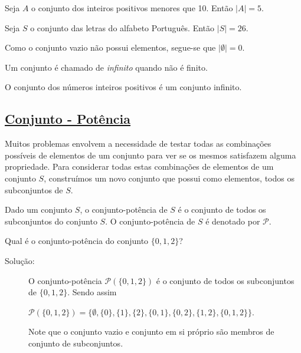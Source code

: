 \begin{exmp}
\label{exem38}
Seja $A$ o conjunto dos inteiros positivos menores que 10. Então $\mid A
\mid=5.$
\end{exmp}


\begin{exmp}
\label{exem39}
Seja $S$ o conjunto das letras do alfabeto Português. Então $\mid S \mid=26.$
\end{exmp}

\begin{exmp}
\label{exem310}
Como o conjunto vazio não possui elementos, segue-se que $\mid \emptyset
\mid=0.$
\end{exmp}

\begin{defn}
\label{def35}
Um conjunto é chamado de \emph{infinito} quando não é finito.
\end{defn}

O conjunto dos números inteiros positivos é um conjunto infinito.

\subsection*{\underline{Conjunto - Potência}}
Muitos problemas envolvem a necessidade de testar todas as combinações possíveis
de elementos de um conjunto para ver se os mesmos satisfazem alguma propriedade.
Para considerar todas estas combinações de elementos de um conjunto $S$,
construímos um novo conjunto que possui como elementos, todos os subconjuntos de
$S$.

\begin{defn}
\label{def36}
Dado um conjunto $S$, o conjunto-potência de $S$ é o conjunto de todos os
subconjuntos do conjunto $S$. O conjunto-potência de $S$ é denotado por
$\mathcal{P}$.
\end{defn}

\begin{exmp}
\label{exem311}
Qual é o conjunto-potência do conjunto $\{0,1,2\}$?

\begin{description}
\item[Solução:] O conjunto-potência $\mathcal{P}(\{0,1,2\})$ é o conjunto de
todos os subconjuntos de $\{0,1,2\}$. Sendo assim
\begin{center}
$\mathcal{P}(\{0,1,2\}) = \{\emptyset, \{0\}, \{1\}, \{2\}, \{0,1\}, \{0,2\},
\{1,2\}, \{0,1,2\}\}$.
\end{center}
Note que o conjunto vazio e conjunto em si próprio são membros de conjunto de
subconjuntos.
\end{description}

\end{exmp}

